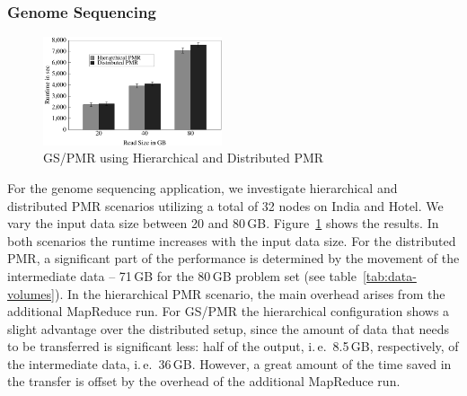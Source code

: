 \documentclass{acm_proc_article-sp}
\newcommand{\upp}{\vspace*{-0.5em}}
\begin{document}
\upp\upp
\subsubsection*{Genome Sequencing}

\begin{figure}[t]
	\centering
		\includegraphics[width=0.47\textwidth]{figures/gs_hihmr_dpmr.pdf}
                \caption{GS/PMR using Hierarchical and Distributed
                  PMR\upp\upp\upp}
\label{fig:gs_hihmr_dpmr}
\end{figure}		

For the genome sequencing application, we investigate hierarchical and
distributed PMR scenarios utilizing a total of 32 nodes on India and
Hotel. We vary the input data size between 20 and 80\,GB.
Figure~\ref{fig:gs_hihmr_dpmr} shows the results. In both scenarios
the runtime increases with the input data size. For the distributed
PMR, a significant part of the performance is determined by the
movement of the intermediate data -- 71\,GB for the 80\,GB problem set
(see table~\ref{tab:data-volumes}). In the hierarchical PMR scenario,
the main overhead arises from the additional MapReduce run. For GS/PMR
the hierarchical configuration shows a slight advantage over the
distributed setup, since the amount of data that needs to be
transferred is significant less: half of the output, i.\,e.\ 8.5\,GB,
respectively, of the intermediate data, i.\,e.\ 36\,GB. However, a
great amount of the time saved in the transfer is offset by the
overhead of the additional MapReduce run.
\end{document}
